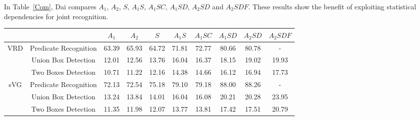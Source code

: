 \documentclass[10pt,twocolumn,letterpaper]{article}
\begin{document}
In Table~\ref{Com}, Dai compares $A_1$, $A_2$, $S$, $A_1S$, $A_1SC$, $A_1SD$, $A_2SD$ and $A_2SDF$. These results show the benefit of exploiting statistical dependencies for joint recognition.

\begin{table*}[tp]
	\caption{Comparison of different variants of the proposed method, using \emph{Recall}@50 as the metric.} \label{Com}
	\begin{tabular}{|c|c|c|c|c|c|c|c|c|c|}
		   &  & $A_1$ & $A_2$ & $S$  & $A_1S$ & $A_1SC$ & $A_1SD$ & $A_2SD$ & $A_2SDF$ \\
		   \hline
		\multirow{3}{*}{VRD}& Predicate Recognition & 63.39 & 65.93 & 64.72  & 71.81 & 72.77 & 80.66 & 80.78 & - \\
		& Union Box Detection & 12.01 & 12.56 & 13.76  & 16.04 & 16.37 & 18.15 & 19.02 & 19.93 \\
		& Two Boxes Detection & 10.71 & 11.22 & 12.16  & 14.38 & 14.66 & 16.12 & 16.94 & 17.73 \\
		\hline\hline
		\multirow{3}{*}{sVG}& Predicate Recognition & 72.13 & 72.54 & 75.18  & 79.10 & 79.18 & 88.00 & 88.26 & - \\
		& Union Box Detection & 13.24 & 13.84 & 14.01  & 16.04 & 16.08 & 20.21 & 20.28 & 23.95 \\
		& Two Boxes Detection & 11.35 & 11.98 & 12.07  & 13.77 & 13.81 & 17.42 & 17.51 & 20.79 \\	
	\end{tabular}
\end{table*}

{\small


}
\end{document}
